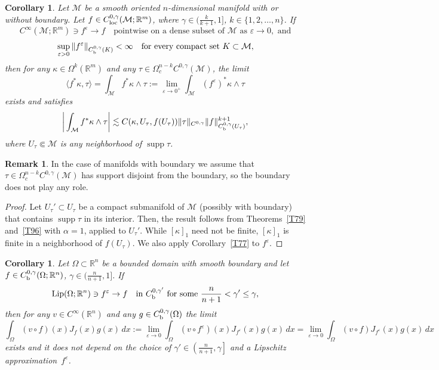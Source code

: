 \documentclass[intlimits,12pt,reqno]{amsart}
\newcommand{\cM}{\mathcal M}
\newcommand{\R}{\mathbb R}
\newcommand{\eps}{\varepsilon}
\numberwithin{equation}{section}
\def\lip{\operatorname{Lip}}
\newtheorem{corollary}[theorem]{Corollary}
\theoremstyle{definition}
\newtheorem{remark}[theorem]{Remark}
\begin{document}
\begin{corollary}
\label{T100}
Let $\cM$ be a smooth oriented $n$-dimensional manifold with or without boundary. Let
$f\in C^{0,\gamma}_{\rm loc}(\cM;\R^m)$, where $\gamma\in\big(\frac{k}{k+1},1\big]$, $k\in \{1,2,\ldots,n\}$. If
$$
C^{\infty}(\cM;\R^m)\ni f^\eps\to f
\quad
\text{pointwise on a dense subset of $\cM$ as }  \eps\to 0, \text{ and} 
$$
$$
\sup_{\eps>0}\Vert f^\eps\Vert_{C_{\rm b}^{0,\gamma}(K)}<\infty
\quad
\text{for every compact set } K\subset\cM,
$$
then for any $\kappa\in\Omega^k(\R^m)$ and any $\tau\in \Omega_c^{n-k}C^{0,\gamma}(\cM)$, the limit
$$
\langle f^*\kappa,\tau\rangle=\int_{\cM} f^*\kappa\wedge\tau:=
\lim_{\eps\to 0^+}\int_{\cM} (f^\eps)^*\kappa\wedge\tau
$$
exists and satisfies
$$
\bigg|\int_{\cM} f^*\kappa\wedge\tau\bigg|\lesssim C(\kappa,U_\tau,f(U_\tau))
\Vert\tau\Vert_{C^{0,\gamma}}\Vert f\Vert^{k+1}_{C_{\rm b}^{0,\gamma}(U_\tau)},
$$
where $U_\tau\Subset\cM$ is any neighborhood of $\operatorname{supp}\tau$. 
\end{corollary}
\begin{remark}
In the case of manifolds with boundary we assume that $\tau\in \Omega_c^{n-k}C^{0,\gamma}(\cM)$ has support disjoint from the boundary, so the boundary does not play any role.
\end{remark}
\begin{proof}
Let $U_\tau'\subset U_\tau$ be a compact submanifold of $\cM$ (possibly with boundary) that contains $\operatorname{supp}\tau$ in its interior. Then, the result follows from Theorems~\ref{T79} and~\ref{T96} with $\alpha=1$, applied to $U_\tau'$. While $[\kappa]_1$ need not be finite, $[\kappa]_1$ is finite in a neighborhood of $f(U_\tau)$. We also apply Corollary~\ref{T77} to $f^\eps$.
\end{proof}
\begin{corollary}
\label{T76}
Let $\Omega\subset\R^n$ be a bounded domain with smooth boundary and let $f\in C_{\rm b}^{0,\gamma}(\Omega;\R^n)$, $\gamma\in\big(\frac{n}{n+1},1\big]$. If 
$$
\lip({\Omega};\R^n)\ni f^\eps\to f
\quad
\text{in $C_{\rm b}^{0,\gamma'}$ for some $\frac{n}{n+1}<\gamma'\leq\gamma$,}
$$
then  for any $v\in C^\infty(\R^n)$ and any $g\in C_{\rm b}^{0,\gamma}(\Omega)$ the limit
$$
\int_\Omega (v\circ f)(x)J_f(x)g(x)\, dx:=
\lim_{\eps\to 0}
\int_\Omega (v\circ f^\eps)(x)J_{f^\eps}(x)g(x)\, dx=
\lim_{\eps\to 0} \int_\Omega  (v\circ f)J_{f^\eps}(x)g(x)\, dx
$$
exists and it does not depend on the choice of $\gamma'\in \left(\frac{n}{n+1},\gamma\right]$ and a Lipschitz approximation~$f^\eps$.
\end{corollary}
\end{document}
